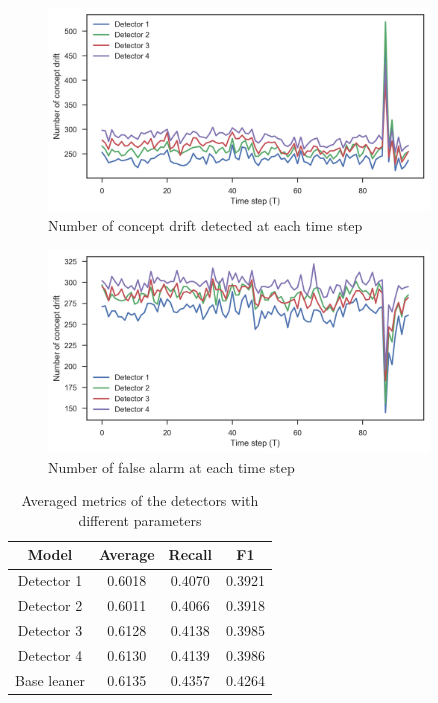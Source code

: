 \begin{figure}
\centering
\includegraphics[width=0.9\textwidth]{num_cd.png}
\caption{Number of concept drift detected at each time step}
\label{num_cd}
\end{figure}

\begin{figure}
\centering
\includegraphics[width=0.9\textwidth]{num_fa.png}
\caption{Number of false alarm at each time step}
\label{num_fa}
\end{figure}


\begin{table}[]
\centering
\begin{tabular}{c|ccc}
Model       & Average & Recall & F1     \\ \hline
Detector 1  & 0.6018  & 0.4070 & 0.3921 \\
Detector 2  & 0.6011  & 0.4066 & 0.3918 \\
Detector 3  & 0.6128  & 0.4138 & 0.3985 \\
Detector 4  & 0.6130  & 0.4139 & 0.3986 \\ \hline
Base leaner & 0.6135  & 0.4357 & 0.4264
\end{tabular}
\caption{Averaged metrics of the detectors with different parameters}
\label{tabel_drift_metrics}
\end{table}

